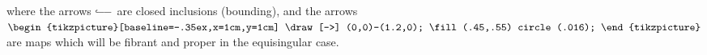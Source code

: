 where the arrows $\lhook\joinrel\relbar\joinrel\relbar$ are closed
inclusions  (bounding), and the arrows
\(\mathrel{\begin{tikzpicture}[baseline=-.35ex,x=1cm,y=1cm]
\draw[->] (0,0)--(1.2,0);
\fill (.45,.55) circle (.016);
\end{tikzpicture}}\)
are maps which will be fibrant and proper
in the equisingular case.
